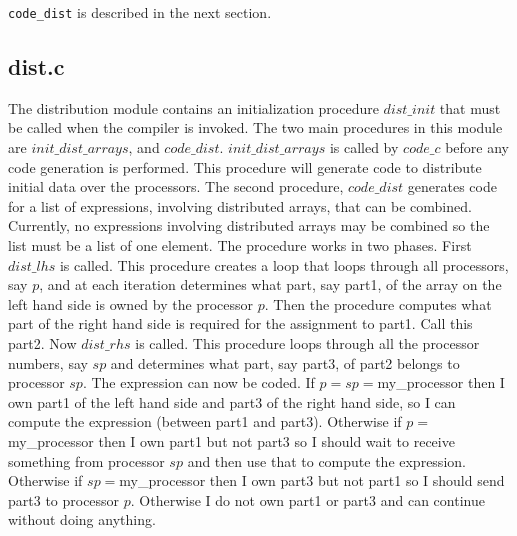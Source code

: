{\tt code\_dist} is described in the next section.

\subsection{{\bf dist.c}}
The distribution module contains an initialization procedure $dist\_init$
that must be called when the compiler is invoked.  The two main procedures
in this module are $init\_dist\_arrays$, and $code\_dist$.  
$init\_dist\_arrays$ is called
by $code\_c$ before any code generation is performed.  This procedure will
generate code to distribute initial data over the processors.  The second
procedure, $code\_dist$ generates code for a list of expressions, involving
distributed arrays, that can be combined.  Currently, no expressions involving
distributed arrays may be combined so the list must be a list of one element.
The procedure works in two phases.  First $dist\_lhs$ is called.  This 
procedure
creates a loop that loops through all processors, say $p$, and at each 
iteration determines what part, say part1, of the array on the left hand side 
is
owned by the processor $p$.  Then the procedure computes what part of the right
hand side is required for the assignment to part1.  Call this part2.  Now
$dist\_rhs$ is called.  This procedure loops through all the processor numbers,
say $sp$ and determines what part, say part3, of part2 belongs to processor
$sp$.  The expression can now be coded.  If $p=sp=$my\_processor then
I own part1 of the left hand side and part3 of the right hand side, so I can
compute the expression (between part1 and part3).  Otherwise if 
$p=$my\_processor then I own part1 but 
not part3 so I should wait to receive something from processor $sp$ and then 
use that to compute the expression.  Otherwise if $sp=$my\_processor then
I own part3 but not part1 so I should send part3 to processor $p$.  Otherwise
I do not own part1 or part3 and can continue without doing anything.

